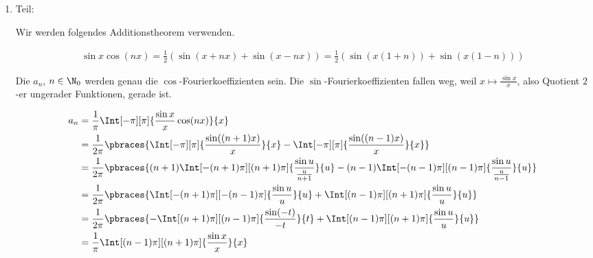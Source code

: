 \begin{solution}

\phantom{}

\begin{enumerate}[label = \arabic*.]

    \item Teil:

    Wir werden folgendes Additionstheorem verwenden.

    \begin{align*}
        \sin x \cos(n x)
        =
        \frac{1}{2}
        (
            \sin(x + n x)
            +
            \sin(x - n x)
        )
        =
        \frac{1}{2}
        (
            \sin(x (1 + n))
            +
            \sin(x (1 - n))
        )
    \end{align*}

    Die $a_n$, $n \in \N_0$ werden genau die $\cos$-Fourierkoeffizienten sein.
    Die $\sin$-Fourierkoeffizienten fallen weg, weil $x \mapsto \frac{\sin x}{x}$, also Quotient $2$-er ungerader Funktionen, gerade ist.

    \begin{align*}
        a_n
        & =
        \frac{1}{\pi}
        \Int[-\pi][\pi]
        {
            \frac{\sin x}{x}
            \cos(n x)
        }{x} \\
        & =
        \frac{1}{2 \pi}
        \pbraces
        {
            \Int[-\pi][\pi]
            {
                \frac{\sin((n + 1) x)}{x}
            }{x}
            -
            \Int[-\pi][\pi]
            {
                \frac{\sin((n - 1) x)}{x}
            }{x}
        } \\
        & =
        \frac{1}{2 \pi}
        \pbraces
        {
            (n + 1)
            \Int[-(n + 1) \pi][(n + 1) \pi]
            {
                \frac{\sin u}
                {
                    \frac{u}{n + 1}
                }
            }{u}
            -
            (n - 1)
            \Int[-(n - 1) \pi][(n - 1) \pi]
            {
                \frac{\sin u}
                {
                    \frac{u}{n - 1}
                }
            }{u}
        } \\
        & =
        \frac{1}{2 \pi}
        \pbraces
        {
            \Int[-(n + 1) \pi][-(n - 1) \pi]
            {
                \frac{\sin u}{u}
            }{u}
            +
            \Int[(n - 1) \pi][(n + 1) \pi]
            {
                \frac{\sin u}{u}
            }{u}
        } \\
        & =
        \frac{1}{2 \pi}
        \pbraces
        {
            -\Int[(n + 1) \pi][(n - 1) \pi]
            {
                \frac{\sin(-t)}{-t}
            }{t}
            +
            \Int[(n - 1) \pi][(n + 1) \pi]
            {
                \frac{\sin u}{u}
            }{u}
        } \\
        & =
        \frac{1}{\pi}
        \Int[(n - 1) \pi][(n + 1) \pi]
        {
            \frac{\sin x}{x}
        }{x}
    \end{align*}


\end{enumerate}
\end{solution}
